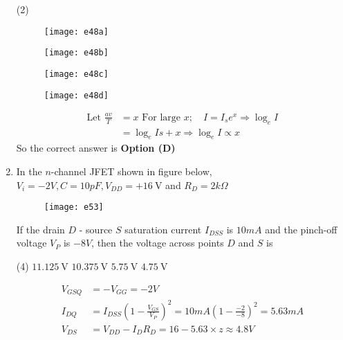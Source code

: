 \begin{enumerate}
{	}
\begin{tasks}(2)
\task[\textbf{A.}] \begin{figure}[H]
	\centering
	\texttt{[image: e48a]}
\end{figure}
\task[\textbf{B.}] \begin{figure}[H]
	\centering
	\texttt{[image: e48b]}
\end{figure}
\task[\textbf{C.}] \begin{figure}[H]
	\centering
	\texttt{[image: e48c]}
\end{figure}
\task[\textbf{D.}] \begin{figure}[H]
	\centering
	\texttt{[image: e48d]}
\end{figure}
\end{tasks}
\begin{answer}
\begin{align*}
\text{Let }\frac{a v}{T}&=x\text{ For large }x ; \quad I=I_{s} e^{x} \Rightarrow \log _{e} I\\&=\log _{e} I s+x \Rightarrow \log _{e} I \propto x
\end{align*}
So the correct answer is \textbf{Option (D)}
\end{answer}
	\item In the $n$-channel JFET shown in figure below, $V_{i}=-2 V, C=10 p F, V_{D D}=+16 \mathrm{~V}$ and $R_{D}=2 k \Omega$\\
	\begin{figure}[H]
		\centering
		\texttt{[image: e53]}
	\end{figure}
	If the drain $D$ - source $S$ saturation current $I_{D S S}$ is $10 m A$ and the pinch-off voltage $V_{P}$ is $-8 V$, then the voltage across points $D$ and $S$ is
{	}
\begin{tasks}(4)
\task[\textbf{A.}] $11.125 \mathrm{~V}$
\task[\textbf{B.}] $10.375 \mathrm{~V}$
\task[\textbf{C.}] $5.75 \mathrm{~V}$
\task[\textbf{D.}] $4.75 \mathrm{~V}$
\end{tasks}
\begin{answer}
\begin{align*}
V_{G S Q}&=-V_{G G}=-2 V\\
I_{D Q}&=I_{D S S}\left(1-\frac{V_{G S}}{V_{P}}\right)^{2}=10 m A\left(1-\frac{-2}{-8}\right)^{2}=5.63 m A\\
V_{D S}&=V_{D D}-I_{D} R_{D}=16-5.63 \times z \approx 4.8 V
\end{align*}

\end{answer}
\end{enumerate}
